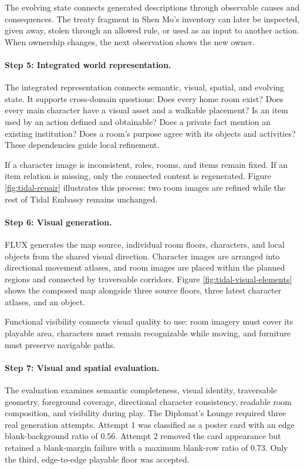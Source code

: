 \documentclass[10pt,twocolumn]{article}
\begin{document}
The evolving state connects generated descriptions through observable causes
and consequences. The treaty fragment in Shen Mo's inventory can later be inspected,
given away, stolen through an allowed rule, or used as an input to another
action. When ownership changes, the next observation shows the new owner.

\paragraph{Step 5: Integrated world representation.}
The integrated representation connects semantic, visual, spatial, and evolving
state. It supports cross-domain questions:
Does every home room exist? Does every main character have a visual asset and a
walkable placement? Is an item used by an action defined and obtainable? Does a
private fact mention an existing institution? Does a room's purpose agree with
its objects and activities? These dependencies guide local refinement.

If a character image is inconsistent, roles, rooms, and items remain fixed. If
an item relation is missing, only the connected content is regenerated. Figure
\ref{fig:tidal-repair} illustrates this process: two room images are refined
while the rest of Tidal Embassy remains unchanged.

\paragraph{Step 6: Visual generation.}
FLUX generates the map source, individual room floors, characters, and local
objects from the shared visual direction. Character images are arranged into
directional movement atlases, and room images are placed within the planned
regions and connected by traversable corridors. Figure
\ref{fig:tidal-visual-elements} shows the composed map alongside three source floors,
three latest character atlases, and an object.

Functional visibility connects visual quality to use: room imagery must cover
its playable area, characters must remain recognizable while moving, and
furniture must preserve navigable paths.

\paragraph{Step 7: Visual and spatial evaluation.}
The evaluation examines semantic completeness, visual identity, traversable
geometry, foreground coverage, directional character consistency, readable
room composition, and visibility during play. The Diplomat's Lounge required
three real generation attempts. Attempt 1 was classified as a poster card with
an edge blank-background ratio of 0.56. Attempt 2 removed the card appearance
but retained a blank-margin failure with a maximum blank-row ratio of 0.73.
Only the third, edge-to-edge playable floor was accepted.
\end{document}
